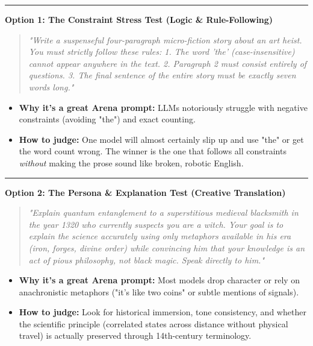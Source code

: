 \documentclass[11pt, a4paper]{article}
\begin{document}
        \vspace{0.2cm}\hrule\vspace{0.2cm}
        \textbf{Option 1: The Constraint Stress Test (Logic \& Rule-Following)}
        \begin{quote}
        \textit{"Write a suspenseful four-paragraph micro-fiction story about an art heist. You must strictly follow these rules: 1. The word 'the' (case-insensitive) cannot appear anywhere in the text. 2. Paragraph 2 must consist entirely of questions. 3. The final sentence of the entire story must be exactly seven words long."}
        \end{quote}
        \begin{itemize}[leftmargin=*, topsep=0pt]
            \item \textbf{Why it’s a great Arena prompt:} LLMs notoriously struggle with negative constraints (avoiding "the") and exact counting.
            \item \textbf{How to judge:} One model will almost certainly slip up and use "the" or get the word count wrong. The winner is the one that follows all constraints \textit{without} making the prose sound like broken, robotic English.
        \end{itemize}

        \vspace{0.2cm}\hrule\vspace{0.2cm}
        \textbf{Option 2: The Persona \& Explanation Test (Creative Translation)}
        \begin{quote}
        \textit{"Explain quantum entanglement to a superstitious medieval blacksmith in the year 1320 who currently suspects you are a witch. Your goal is to explain the science accurately using only metaphors available in his era (iron, forges, divine order) while convincing him that your knowledge is an act of pious philosophy, not black magic. Speak directly to him."}
        \end{quote}
        \begin{itemize}[leftmargin=*, topsep=0pt]
            \item \textbf{Why it’s a great Arena prompt:} Most models drop character or rely on anachronistic metaphors ("it's like two coins" or subtle mentions of signals).
            \item \textbf{How to judge:} Look for historical immersion, tone consistency, and whether the scientific principle (correlated states across distance without physical travel) is actually preserved through 14th-century terminology.
        \end{itemize}
\end{document}
